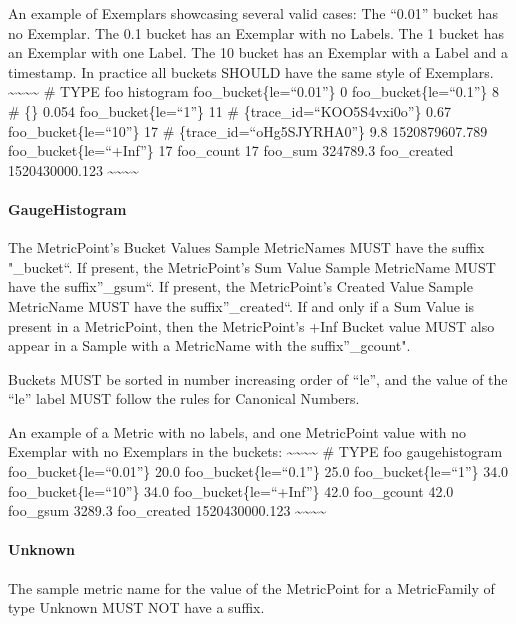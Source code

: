 \documentclass[a4paper,12pt,notitlepage,twoside,openright]{article}
\begin{document}
An example of Exemplars showcasing several valid cases: The ``0.01''
bucket has no Exemplar. The 0.1 bucket has an Exemplar with no Labels.
The 1 bucket has an Exemplar with one Label. The 10 bucket has an
Exemplar with a Label and a timestamp. In practice all buckets SHOULD
have the same style of Exemplars.
\textasciitilde\textasciitilde\textasciitilde\textasciitilde{} \# TYPE
foo histogram foo\_bucket\{le=``0.01''\} 0 foo\_bucket\{le=``0.1''\} 8
\# \{\} 0.054 foo\_bucket\{le=``1''\} 11 \#
\{trace\_id=``KOO5S4vxi0o''\} 0.67 foo\_bucket\{le=``10''\} 17 \#
\{trace\_id=``oHg5SJYRHA0''\} 9.8 1520879607.789
foo\_bucket\{le=``+Inf''\} 17 foo\_count 17 foo\_sum 324789.3
foo\_created 1520430000.123
\textasciitilde\textasciitilde\textasciitilde\textasciitilde{}

\hypertarget{gaugehistogram-1}{%
\paragraph{GaugeHistogram}\label{gaugehistogram-1}}

The MetricPoint's Bucket Values Sample MetricNames MUST have the suffix
"\_bucket``. If present, the MetricPoint's Sum Value Sample MetricName
MUST have the suffix''\_gsum``. If present, the MetricPoint's Created
Value Sample MetricName MUST have the suffix''\_created``. If and only
if a Sum Value is present in a MetricPoint, then the MetricPoint's +Inf
Bucket value MUST also appear in a Sample with a MetricName with the
suffix''\_gcount".

Buckets MUST be sorted in number increasing order of ``le'', and the
value of the ``le'' label MUST follow the rules for Canonical Numbers.

An example of a Metric with no labels, and one MetricPoint value with no
Exemplar with no Exemplars in the buckets:
\textasciitilde\textasciitilde\textasciitilde\textasciitilde{} \# TYPE
foo gaugehistogram foo\_bucket\{le=``0.01''\} 20.0
foo\_bucket\{le=``0.1''\} 25.0 foo\_bucket\{le=``1''\} 34.0
foo\_bucket\{le=``10''\} 34.0 foo\_bucket\{le=``+Inf''\} 42.0
foo\_gcount 42.0 foo\_gsum 3289.3 foo\_created 1520430000.123
\textasciitilde\textasciitilde\textasciitilde\textasciitilde{}

\hypertarget{unknown-1}{%
\paragraph{Unknown}\label{unknown-1}}

The sample metric name for the value of the MetricPoint for a
MetricFamily of type Unknown MUST NOT have a suffix.
\end{document}
